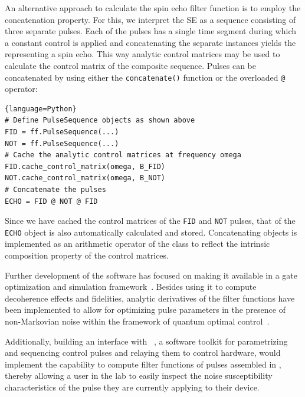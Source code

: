 An alternative approach to calculate the spin echo filter function is to employ the concatenation property.
For this, we interpret the SE as a sequence consisting of three separate pulses.
Each of the pulses has a single time segment during which a constant control is applied and concatenating the separate \pulsesequence instances yields the \pulsesequence representing a spin echo.
This way analytic control matrices may be used to calculate the control matrix of the composite sequence.
Pulses can be concatenated by using either the \verb|concatenate()| function or the overloaded \verb|@| operator:
\begin{lstlisting}{language=Python}
# Define PulseSequence objects as shown above
FID = ff.PulseSequence(...)
NOT = ff.PulseSequence(...)
# Cache the analytic control matrices at frequency omega
FID.cache_control_matrix(omega, B_FID)
NOT.cache_control_matrix(omega, B_NOT)
# Concatenate the pulses
ECHO = FID @ NOT @ FID
\end{lstlisting}
Since we have cached the control matrices of the \texttt{FID} and \texttt{NOT} pulses, that of the \texttt{ECHO} object is also automatically calculated and stored.
Concatenating \pulsesequence objects is implemented as an arithmetic operator of the class to reflect the intrinsic composition property of the control matrices.

Further development of the software has focused on making it available in a gate optimization and simulation framework~\cite{Teske2021,Teske2022}.
Besides using it to compute decoherence effects and fidelities, analytic derivatives of the filter functions have been implemented to allow for optimizing pulse parameters in the presence of non-Markovian noise within the framework of quantum optimal control~\cite{Le2022}.

Additionally, building an interface with \qupulse~\cite{Humpohl,Humpohl2021}, a software toolkit for parametrizing and sequencing control pulses and relaying them to control hardware, would implement the capability to compute filter functions of pulses assembled in \qupulse, thereby allowing a user in the lab to easily inspect the noise susceptibility characteristics of the pulse they are currently applying to their device.

